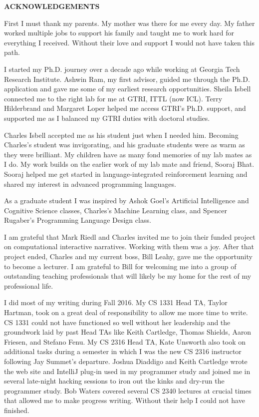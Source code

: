 \clearpage
\begin{centering}
\textbf{ACKNOWLEDGEMENTS}\\
\vspace{\baselineskip}
\end{centering}


First I must thank my parents. My mother was there for me every day. My father worked multiple jobs to support his family and taught me to work hard for everything I received. Without their love and support I would not have taken this path.

I started my Ph.D. journey over a decade ago while working at Georgia Tech Research Institute. Ashwin Ram, my first advisor, guided me through the Ph.D. application and gave me some of my earliest research opportunities. Sheila Isbell connected me to the right lab for me at GTRI, ITTL (now ICL). Terry Hilderbrand and Margaret Loper helped me access GTRI's Ph.D. support, and supported me as I balanced my GTRI duties with doctoral studies.

Charles Isbell accepted me as his student just when I needed him. Becoming Charles's student was invigorating, and his graduate students were as warm as they were brilliant. My children have as many fond memories of my lab mates as I do. My work builds on the earlier work of my lab mate and friend, Sooraj Bhat. Sooraj helped me get started in language-integrated reinforcement learning and shared my interest in advanced programming languages.

As a graduate student I was inspired by Ashok Goel's Artificial Intelligence and Cognitive Science classes, Charles's Machine Learning class, and Spencer Rugaber's Programming Language Design class.

I am grateful that Mark Riedl and Charles invited me to join their funded project on computational interactive narratives. Working with them was a joy. After that project ended, Charles and my current boss, Bill Leahy, gave me the opportunity to become a lecturer. I am grateful to Bill for welcoming me into a group of outstanding teaching professionals that will likely be my home for the rest of my professional life.

I did most of my writing during Fall 2016. My CS 1331 Head TA, Taylor Hartman, took on a great deal of responsibility to allow me more time to write. CS 1331 could not have functioned so well without her leadership and the groundwork laid by past Head TAs like Keith Cartledge, Thomas Shields, Aaron Friesen, and Stefano Fenu. My CS 2316 Head TA, Kate Unsworth also took on additional tasks during a semester in which I was the new CS 2316 instructor following Jay Summet's departure. Joshua Diaddigo and Keith Cartledge wrote the web site and IntelliJ plug-in used in my programmer study and joined me in several late-night hacking sessions to iron out the kinks and dry-run the programmer study. Bob Waters covered several CS 2340 lectures at crucial times that allowed me to make progress writing. Without their help I could not have finished.


